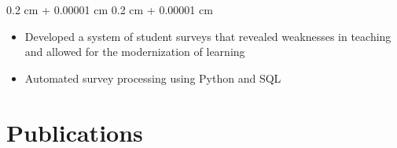 \documentclass[10pt, letterpaper]{article}
\newenvironment{highlights}{
    \begin{itemize}[
        topsep=0.10 cm,
        parsep=0.10 cm,
        partopsep=0pt,
        itemsep=0pt,
        leftmargin=0.4 cm + 10pt
    ]
}{
    \end{itemize}
} %
\newenvironment{onecolentry}{
    \begin{adjustwidth}{
        0.2 cm + 0.00001 cm
    }{
        0.2 cm + 0.00001 cm
    }
}{
    \end{adjustwidth}
} %
\newenvironment{twocolentry}[2][]{
    \onecolentry
    \def\secondColumn{#2}
    \setcolumnwidth{\fill, 4.5 cm}
    \begin{paracol}{2}
}{
    \switchcolumn \raggedleft \secondColumn
    \end{paracol}
    \endonecolentry
} %
\begin{document}
        \vspace{0.10 cm}
        \begin{onecolentry}
            \begin{highlights}
                \item Developed a system of student surveys that revealed weaknesses in teaching and allowed for the modernization of learning
                \item Automated survey processing using Python and SQL
            \end{highlights}
        \end{onecolentry}



            
            




    
    \section{Publications}
\end{document}
